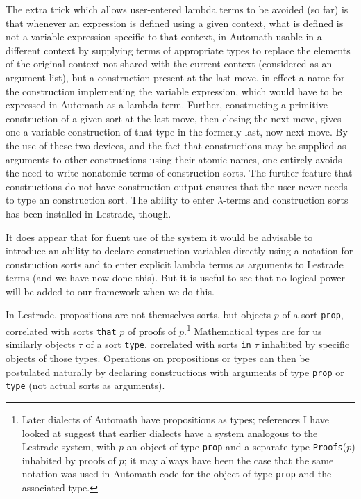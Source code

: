\documentclass[12pt]{article}
\begin{document}
The extra trick which allows user-entered lambda terms to be avoided (so far) is that whenever an expression is defined using a given context, what is defined is not a variable
expression specific to that context, in Automath usable in a different context by supplying terms of appropriate types to replace the elements of the original context not shared with the current context (considered as an argument list), but a construction present at the last move, in effect a name for the construction implementing the variable expression, which would have to be expressed in Automath as a lambda term.  Further, constructing a primitive construction of a given sort at the last move, then closing the next move, gives one a variable
construction of that type in the formerly last, now next move.  By the use of these two devices, and the fact that constructions may be supplied as arguments to other constructions using their atomic names, one entirely avoids the need to write nonatomic terms of construction sorts.  The further feature that constructions do not have construction output ensures that the user never needs to type an construction sort.  The ability to enter $\lambda$-terms and construction sorts has been installed in Lestrade, though.

It does appear that for fluent use of the system it would be advisable to introduce an ability to declare construction variables directly using a notation for construction sorts and to enter explicit lambda terms as arguments to Lestrade terms (and we have now done this).  But it is useful to see that no logical power will be added to our framework when we do this.

In Lestrade, propositions are not themselves sorts, but objects $p$ of a sort {\tt prop}, correlated with sorts {\tt that} $p$ of proofs of $p$.\footnote{Later dialects of Automath have propositions as types; references I have looked at suggest that earlier dialects have a system analogous to the Lestrade system, with $p$ an object of type {\tt prop} and a separate type {\tt Proofs}($p$) inhabited by proofs of $p$; it may always have been the case that the same notation was used in Automath code for the object of type {\tt prop} and the associated type.}  Mathematical types are for us
similarly objects $\tau$ of a sort {\tt type}, correlated with sorts {\tt in} $\tau$ inhabited by specific objects of those types.   Operations on propositions or types can then
be postulated  naturally by declaring constructions with arguments of type {\tt prop} or {\tt type} (not actual sorts as arguments).
\end{document}
